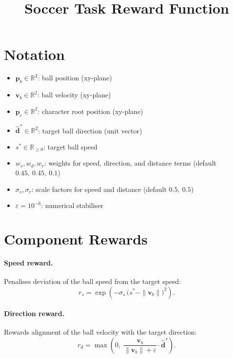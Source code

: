 \documentclass[11pt]{article}
\title{Soccer Task Reward Function}
\author{}
\date{}
\begin{document}
\maketitle

\section*{Notation}

\begin{itemize}
    \item $\mathbf{p}_b \in \mathbb{R}^2$: ball position (xy-plane)
    \item $\mathbf{v}_b \in \mathbb{R}^2$: ball velocity (xy-plane)
    \item $\mathbf{p}_c \in \mathbb{R}^2$: character root position (xy-plane)
    \item $\hat{\mathbf{d}}^* \in \mathbb{R}^2$: target ball direction (unit vector)
    \item $s^* \in \mathbb{R}_{\geq 0}$: target ball speed
    \item $w_s, w_d, w_r$: weights for speed, direction, and distance terms (default $0.45,\ 0.45,\ 0.1$)
    \item $\sigma_s, \sigma_r$: scale factors for speed and distance (default $0.5,\ 0.5$)
    \item $\varepsilon = 10^{-6}$: numerical stabiliser
\end{itemize}

\section*{Component Rewards}

\paragraph{Speed reward.} Penalises deviation of the ball speed from the target speed:
\begin{equation}
    r_s = \exp\!\left(-\sigma_s \, \bigl(s^* - \|\mathbf{v}_b\|\bigr)^2\right).
\end{equation}

\paragraph{Direction reward.} Rewards alignment of the ball velocity with the target direction:
\begin{equation}
    r_d = \max\!\left(0,\; \frac{\mathbf{v}_b}{\|\mathbf{v}_b\| + \varepsilon} \cdot \hat{\mathbf{d}}^*\right).
\end{equation}
\end{document}

